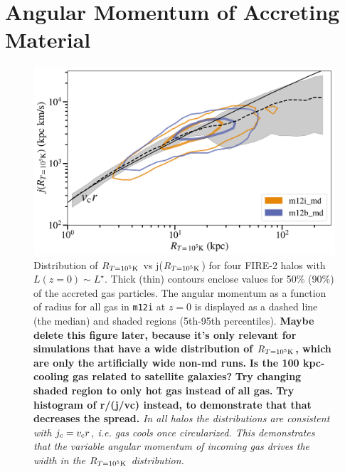 \documentclass[fleqn,usenatbib]{mnras}
\newcommand{\Rcool}{R_{T=10^5 {\rm K}}}
\begin{document}






\appendix

\section{Angular Momentum of Accreting Material}

\begin{figure}
    \centering
    \includegraphics[width=\columnwidth]{figures/j_vs_rcondense.png}
    \caption{
    Distribution of $\Rcool$ vs j($\Rcool$) for four FIRE-2 halos with $L(z=0) \sim L^\star$.
Thick (thin) contours enclose values for 50\% (90\%) of the accreted gas particles.
The angular momentum as a function of radius for all gas in \texttt{m12i} at $z=0$ is displayed as a dashed line (the median) and shaded regions (5th-95th percentiles).
\textbf{
Maybe delete this figure later, because it's only relevant for simulations that have a wide distribution of $\Rcool$, which are only the artificially wide non-md runs.
}
\textbf{Is the 100 kpc-cooling gas related to satellite galaxies?}
\textbf{Try changing shaded region to only hot gas instead of all gas.}
\textbf{Try histogram of r/(j/vc) instead, to demonstrate that that decreases the spread.}
\textit{
In all halos the distributions are consistent with $j_{\rm c} = v_{\rm c} r$, i.e. gas cools once circularized.
This demonstrates that the variable angular momentum of incoming gas drives the width in the $\Rcool$ distribution.
}
    }
    \label{f: jcool vs Rcool}
\end{figure}
\end{document}
